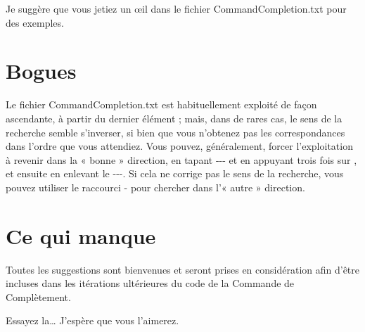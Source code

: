 \documentclass[12pt,french]{article}
\newcommand{\esc}{{\WD \symbol{82}}}
\newcommand{\maj}{{\WA \symbol{241}}}
\newcommand{\fontelatex}{\ttfamily}
\newcommand{\argument}[1]{{\fontelatex#1}}
\begin{document}
Je suggère que vous jetiez un \oe{}il dans le fichier \textsf{CommandCompletion.txt} pour des exemples.

\section*{Bogues}

Le fichier \textsf{CommandCompletion.txt} est habituellement exploité de façon ascendante, à partir du dernier 
élément ; mais, dans de rares cas, le sens de la recherche semble s'inverser, si bien que vous n'obtenez pas les 
correspondances dans l'ordre que vous attendiez. Vous pouvez, généralement, forcer l'exploitation à revenir dans la 
« bonne » direction, en tapant \argument{-{}-{}-} et en appuyant trois fois sur \esc{}, et ensuite en enlevant le  
\argument{-\null-\null-}. Si cela ne corrige pas le sens de la recherche, vous pouvez utiliser le raccourci \maj-\esc{} 
pour chercher dans l'« autre » direction.

\section*{Ce qui manque}

Toutes les suggestions sont bienvenues et seront prises en considération afin d'être incluses dans les itérations 
ultérieures du code de la Commande de Complètement. 

Essayez la… J'espère que vous l'aimerez.

%
\end{document}
